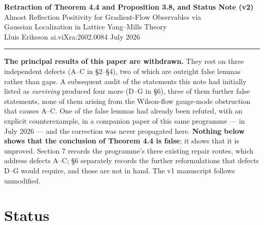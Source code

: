 \documentclass[11pt]{article}
\begin{document}
\begin{center}
{\Large\bfseries Retraction of Theorem 4.4 and Proposition 3.8, and Status Note (v2)}\\[5pt]
{\large Almost Reflection Positivity for Gradient-Flow Observables via\\
Gaussian Localization in Lattice Yang--Mills Theory}\\[6pt]
Lluis Eriksson \quad\textbullet\quad ai.viXra:2602.0084 \quad\textbullet\quad July 2026
\end{center}

\noindent\rule{\textwidth}{0.8pt}

\vspace{2pt}
\noindent
\textbf{The principal results of this paper are withdrawn.} They rest on three
independent defects (A--C in \S2--\S4), two of which are outright false lemmas rather
than gaps. A subsequent audit of the statements this note had initially listed as
\emph{surviving} produced four more (D--G in \S6), three of them further false
statements, none of them arising from the Wilson-flow gauge-mode obstruction that
causes A--C. One of the
false lemmas had already been refuted, with an explicit counterexample, in a companion
paper of this same programme --- in July 2026 --- and the correction was never
propagated here.
\textbf{Nothing below shows that the conclusion of Theorem 4.4 is false}; it shows
that it is unproved. Section 7 records the programme's three existing repair routes,
which address defects A--C; \S6 separately records the further reformulations that
defects D--G would require, and those are not in hand. The v1 manuscript follows
unmodified.

\section{Status}
\end{document}
